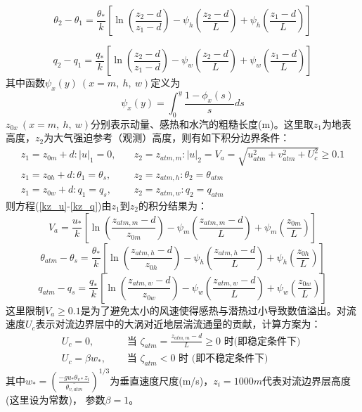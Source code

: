 \begin{equation}
\theta_{2}-\theta_{1}=\frac{\theta_{*}}{k}\left[\ln \left(\frac{z_{2}-d}{z_{1}-d}\right)-\psi_{h}\left(\frac{z_{2}-d}{L}\right)+\psi_{h}\left(\frac{z_{1}-d}{L}\right)\right]
\end{equation}

\begin{equation}
q_{2}-q_{1}=\frac{q_{*}}{k}\left[\ln \left(\frac{z_{2}-d}{z_{1}-d}\right)-\psi_{w}\left(\frac{z_{2}-d}{L}\right)+\psi_{w}\left(\frac{z_{1}-d}{L}\right)\right]
\end{equation}
其中函数$\psi_x\left(y\right)\ (x=m,\ h,\ w)$定义为
\begin{equation}
\psi_{x}(y)=\int_{0}^{y} \frac{1-\phi_{x}(s)}{s} d s
\end{equation}
$z_{0x}\ (x=m,\ h,\ w)$分别表示动量、感热和水汽的粗糙长度(m)。这里取$z_1$为地表高度，$z_2$为大气强迫参考（观测）高度，则有如下积分边界条件：
\begin{equation}\label{VaIni}
\begin{array}{ll}z_{1}=z_{0 m}+d:|u|_{1}=0, \quad & z_{2}=z_{atm, m}: |u|_{2}=V_{a}=\sqrt{u_{atm}^{2}+v_{atm}^{2}+U_{c}^{2}} \geq 0.1 \\ 
     z_{1}=z_{0 h}+d: \theta_{1}=\theta_{s}, & z_{2}=z_{atm, h}: \theta_{2}=\theta_{atm} \\ 
     z_{1}=z_{0 w}+d: q_{1}=q_{s}, & z_{2}=z_{atm, w}: q_{2}=q_{atm}\end{array}
\end{equation}
则方程(\ref{kz_u}-\ref{kz_q})由$z_1$到$z_2$的积分结果为：
\begin{equation}\label{Va}
V_{a}=\frac{u_{*}}{k}\left[\ln \left(\frac{z_{atm, m}-d}{z_{0 m}}\right)-\psi_{m}\left(\frac{z_{atm, m}-d}{L}\right)+\psi_{m}\left(\frac{z_{0 m}}{L}\right)\right]
\end{equation}
\begin{equation}\label{theta_atm-theta_s}
\theta_{atm}-\theta_{s}=\frac{\theta_{*}}{k}\left[\ln \left(\frac{z_{atm, h}-d}{z_{0 h}}\right)-\psi_{h}\left(\frac{z_{atm, h}-d}{L}\right)+\psi_{h}\left(\frac{z_{0 h}}{L}\right)\right]
\end{equation}
\begin{equation}\label{q_atm-qs}
q_{atm}-q_{s}=\frac{q_{*}}{k}\left[\ln \left(\frac{z_{atm, w}-d}{z_{0 w}}\right)-\psi_{w}\left(\frac{z_{atm, w}-d}{L}\right)+\psi_{w}\left(\frac{z_{0 w}}{L}\right)\right]
\end{equation}
这里限制$V_a\geq0.1$是为了避免太小的风速使得感热与潜热过小导致数值溢出。对流速度$U_c$表示对流边界层中的大涡对近地层湍流通量的贡献，计算方案为：
\begin{equation}
\begin{array}{ll} U_{c}=0, \quad & \text { 当 } \zeta_{atm}=\frac{z_{atm, m}-d}{L} \geq 0 \text { 时(即稳定条件下) } \\
       U_{c}=\beta w_{*}, \quad & \text { 当 } \zeta_{atm}<0 \text { 时 (即不稳定条件下) }\end{array}
\end{equation}
其中$w_\ast={(\frac{-gu_\ast\theta_{v\ast}z_i}{\bar{\theta_{v,atm}}})}^{1/3}$为垂直速度尺度(m/s)，$z_i=1000m$代表对流边界层高度(这里设为常数)，
参数$\beta=1$。

